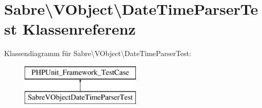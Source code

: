 \hypertarget{class_sabre_1_1_v_object_1_1_date_time_parser_test}{}\section{Sabre\textbackslash{}V\+Object\textbackslash{}Date\+Time\+Parser\+Test Klassenreferenz}
\label{class_sabre_1_1_v_object_1_1_date_time_parser_test}
Klassendiagramm für Sabre\textbackslash{}V\+Object\textbackslash{}Date\+Time\+Parser\+Test\+:\begin{figure}[H]
\begin{center}
\leavevmode
\includegraphics[height=2.000000cm]{class_sabre_1_1_v_object_1_1_date_time_parser_test}
\end{center}
\end{figure}
